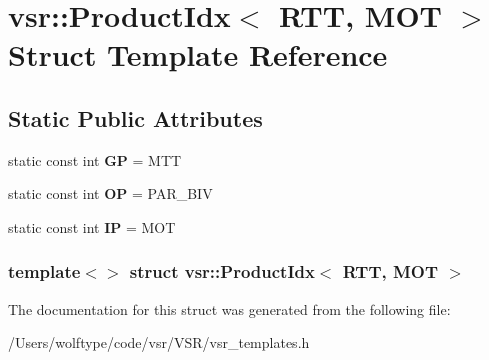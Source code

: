 \hypertarget{structvsr_1_1_product_idx_3_01_r_t_t_00_01_m_o_t_01_4}{\section{vsr\-:\-:Product\-Idx$<$ R\-T\-T, M\-O\-T $>$ Struct Template Reference}
\label{structvsr_1_1_product_idx_3_01_r_t_t_00_01_m_o_t_01_4}
}
\subsection*{Static Public Attributes}
\begin{DoxyCompactItemize}
\item 
\hypertarget{structvsr_1_1_product_idx_3_01_r_t_t_00_01_m_o_t_01_4_a74ad2317682a1302136ce370b46dcbcc}{static const int {\bfseries G\-P} = M\-T\-T}\label{structvsr_1_1_product_idx_3_01_r_t_t_00_01_m_o_t_01_4_a74ad2317682a1302136ce370b46dcbcc}

\item 
\hypertarget{structvsr_1_1_product_idx_3_01_r_t_t_00_01_m_o_t_01_4_ad1d1015c44727122406b95f63745de1a}{static const int {\bfseries O\-P} = P\-A\-R\-\_\-\-B\-I\-V}\label{structvsr_1_1_product_idx_3_01_r_t_t_00_01_m_o_t_01_4_ad1d1015c44727122406b95f63745de1a}

\item 
\hypertarget{structvsr_1_1_product_idx_3_01_r_t_t_00_01_m_o_t_01_4_a57141ae1fc8a8507cd17f378c6a6ab72}{static const int {\bfseries I\-P} = M\-O\-T}\label{structvsr_1_1_product_idx_3_01_r_t_t_00_01_m_o_t_01_4_a57141ae1fc8a8507cd17f378c6a6ab72}

\end{DoxyCompactItemize}
\subsubsection*{template$<$$>$ struct vsr\-::\-Product\-Idx$<$ R\-T\-T, M\-O\-T $>$}



The documentation for this struct was generated from the following file\-:\begin{DoxyCompactItemize}
\item 
/\-Users/wolftype/code/vsr/\-V\-S\-R/vsr\-\_\-templates.\-h\end{DoxyCompactItemize}
